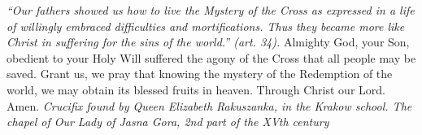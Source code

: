 \pagestyle{empty}
\hspace{0pt}
\vfill

\textit{``Our fathers showed us how to live the Mystery of the
Cross as expressed in a life of willingly embraced difficulties and
mortifications. Thus they became more like Christ in suffering for
the sins of the world.'' (art. 34).}
\medbreak
Almighty God, your Son, obedient to your Holy Will suffered the agony of the Cross that all people may be saved. Grant
us, we pray that knowing the mystery of the Redemption of the
world, we may obtain its blessed fruits in heaven. Through Christ
our Lord. Amen.
\vfill
\textit{Crucifix found by Queen Elizabeth Rakuszanka, in the Krakow
school. The chapel of Our Lady of Jasna Gora, 2nd part of the
XVth century}
\hspace{0pt}
\newpage
